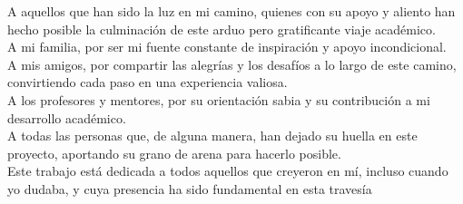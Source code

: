 A aquellos que han sido la luz en mi camino, quienes con su apoyo y aliento han hecho posible la culminación de este arduo pero gratificante viaje académico.\\
A mi familia, por ser mi fuente constante de inspiración y apoyo incondicional.\\
A mis amigos, por compartir las alegrías y los desafíos a lo largo de este camino, convirtiendo cada paso en una experiencia valiosa.\\
A los profesores y mentores, por su orientación sabia y su contribución a mi desarrollo académico.\\
A todas las personas que, de alguna manera, han dejado su huella en este proyecto, aportando su grano de arena para hacerlo posible.\\
Este trabajo está dedicada a todos aquellos que creyeron en mí, incluso cuando yo dudaba, y cuya presencia ha sido fundamental en esta travesía